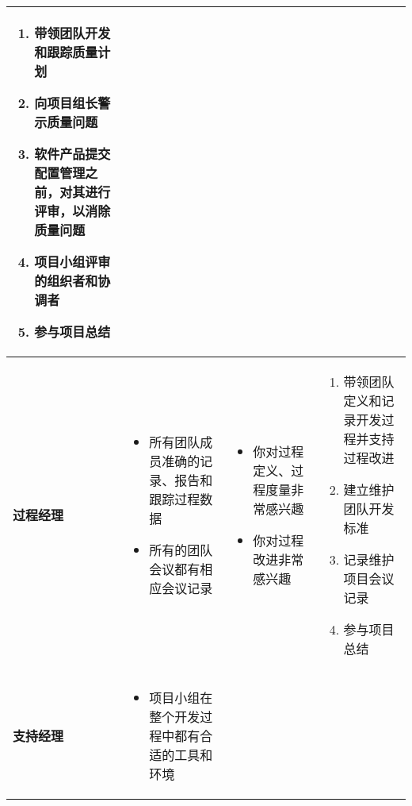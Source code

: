 \begin{spacing}{1.2}
\begin{longtable}{|m{1.5cm}<{\centering}|m{4.2cm}|m{4.2cm}|m{4.2cm}|}
        \begin{enumerate}[label=\arabic*.,leftmargin=1.5em]
            \item 带领团队开发和跟踪质量计划
            \item 向项目组长警示质量问题
            \item 软件产品提交配置管理之前，对其进行评审，以消除质量问题
            \item 项目小组评审的组织者和协调者
            \item 参与项目总结
            \vspace{-1.3em}
        \end{enumerate} \\ \hline
        \textbf{过程经理} & 
        \vspace{-1.1em}
        \begin{itemize}[leftmargin=1.3em]
            \item 所有团队成员准确的记录、报告和跟踪过程数据
            \item 所有的团队会议都有相应会议记录
            \vspace{-1.3em}
        \end{itemize} &
        \vspace{-1.1em}
        \begin{itemize}[leftmargin=1.3em]
            \item 你对过程定义、过程度量非常感兴趣
            \item 你对过程改进非常感兴趣
            \vspace{-1.3em}
        \end{itemize} &
        \vspace{-1.1em}
        \begin{enumerate}[label=\arabic*.,leftmargin=1.5em]
            \item 带领团队定义和记录开发过程并支持过程改进
            \item 建立维护团队开发标准
            \item 记录维护项目会议记录
            \item 参与项目总结
            \vspace{-1.3em}
        \end{enumerate} \\ \hline
        \textbf{支持经理} & 
        \vspace{-1.1em}
        \begin{itemize}[leftmargin=1.3em]
            \item 项目小组在整个开发过程中都有合适的工具和环境

\end{itemize}
\end{longtable}
\end{spacing}
